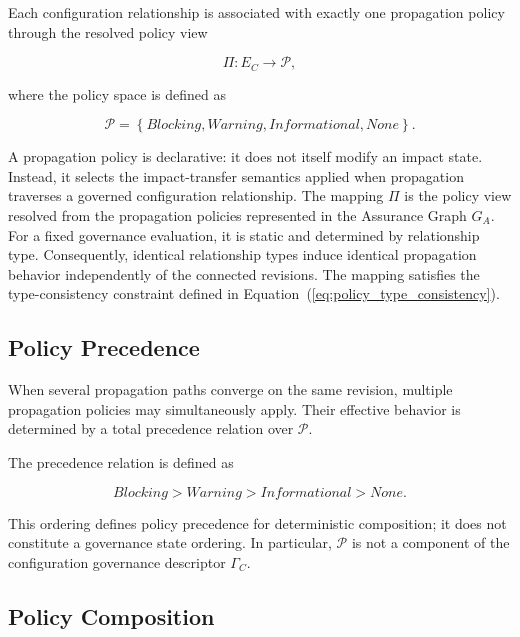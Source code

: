\documentclass[10pt]{article}
\begin{document}
Each configuration relationship is associated with exactly one propagation policy through the resolved policy view

\begin{equation}
	\Pi:E_C\rightarrow\mathcal P,
\end{equation}

where the policy space is defined as

\begin{equation}
	\mathcal{P}=
	\left\{
	\textit{Blocking},
	\textit{Warning},
	\textit{Informational},
	\textit{None}
	\right\}.
	\label{eq:policy_set}
\end{equation}

A propagation policy is declarative: it does not itself modify an impact state. Instead, it selects the impact-transfer semantics applied when propagation traverses a governed configuration relationship.
The mapping $\Pi$ is the policy view resolved from the propagation policies represented in the Assurance Graph $G_A$. For a fixed governance evaluation, it is static and determined by relationship type. Consequently, identical relationship types induce identical propagation behavior independently of the connected revisions. The mapping satisfies the type-consistency constraint defined in Equation~(\ref{eq:policy_type_consistency}).

\subsection{Policy Precedence}

When several propagation paths converge on the same revision, multiple propagation policies may simultaneously apply. Their effective behavior is determined by a total precedence relation over $\mathcal{P}$.

The precedence relation is defined as

\begin{equation}
	\textit{Blocking}
	>
	\textit{Warning}
	>
	\textit{Informational}
	>
	\textit{None}.
	\label{eq:policy_order}
\end{equation}

This ordering defines policy precedence for deterministic composition; it does not constitute a governance state ordering. In particular, $\mathcal P$ is not a component of the configuration governance descriptor $\Gamma_C$.

\subsection{Policy Composition}
\end{document}
